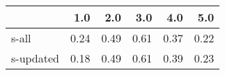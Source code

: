 \begin{tabular}{lrrrrr}
\toprule
{} &  1.0 &  2.0 &  3.0 &  4.0 &  5.0 \\
\midrule
s-all     & 0.24 & 0.49 & 0.61 & 0.37 & 0.22 \\
s-updated & 0.18 & 0.49 & 0.61 & 0.39 & 0.23 \\
\bottomrule
\end{tabular}
